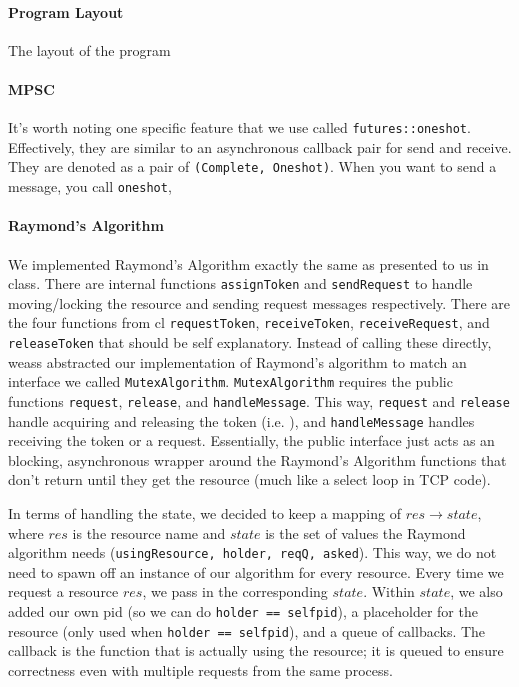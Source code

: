 \documentclass{article}
\begin{document}
\paragraph*{Program Layout}
The layout of the program 

\paragraph*{MPSC}
It's worth noting one specific feature that we use called \texttt{futures::oneshot}. Effectively, they are similar to an asynchronous callback pair for send and receive. They are denoted as a pair of \texttt{(Complete, Oneshot)}. When you want to send a message, you call \texttt{oneshot}, 

\paragraph*{Raymond's Algorithm}
We implemented Raymond's Algorithm exactly the same as presented to us in class. There are internal functions \texttt{assignToken} and \texttt{sendRequest} to handle moving/locking the resource and sending request messages respectively. There are the four functions from cl \texttt{requestToken}, \texttt{receiveToken}, \texttt{receiveRequest}, and \texttt{releaseToken} that should be self explanatory. Instead of calling these directly, weass abstracted our implementation  of Raymond's algorithm to match an interface we called \texttt{MutexAlgorithm}. \texttt{MutexAlgorithm} requires the public functions \texttt{request}, \texttt{release}, and \texttt{handleMessage}. This way, \texttt{request} and \texttt{release} handle acquiring and releasing the token (i.e. ), and \texttt{handleMessage} handles receiving the token or a request. Essentially, the public interface just acts as an blocking, asynchronous wrapper around the Raymond's Algorithm functions that don't return until they get the resource (much like a select loop in TCP code).

In terms of handling the state, we decided to keep a mapping of $res \to state$, where $res$ is the resource name and $state$ is the set of values the Raymond algorithm needs (\texttt{usingResource, holder, reqQ, asked}). This way, we do not need to spawn off an instance of our algorithm for every resource. Every time we request a resource $res$, we pass in the corresponding $state$. Within $state$, we also added our own pid (so we can do \texttt{holder == selfpid}), a placeholder for the resource (only used when \texttt{holder == selfpid}), and a queue of callbacks. The callback is the function that is actually using the resource; it is queued to ensure correctness even with multiple requests from the same process.
\end{document}
